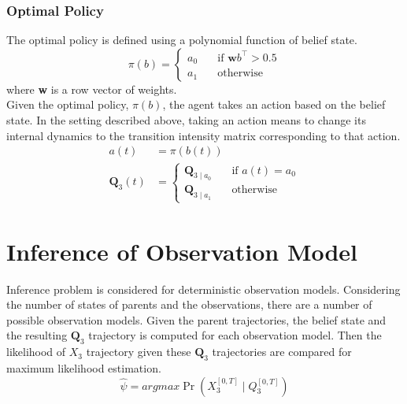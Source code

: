 \subsubsection{Optimal Policy}
The optimal policy is defined using a polynomial function of belief state.
\begin{equation}
\pi(b) = 
\begin{cases}
a_0 & \quad \text{if } \textbf{w}b^\intercal > 0.5 \\
a_1 & \quad \text{otherwise}
\end{cases}
\label{eq:policy}
\end{equation}
where \textbf{w} is a row vector of weights.\\
Given the optimal policy, $ \pi(b) $, the agent takes an action based on the belief state. In the setting described above, taking an action means to change its internal dynamics to the transition intensity matrix corresponding to that action.
\begin{align}
a(t) &= \pi(b(t))\\
\textbf{Q}_3(t) & = \begin{cases}
\textbf{Q}_{3\mid a_{0}} & \quad \text{if } a(t) = a_0 \\
\textbf{Q}_{3\mid a_{1}} & \quad \text{otherwise}
\end{cases}
\end{align}

\section{Inference of Observation Model}
Inference problem is considered for deterministic observation models. Considering the number of states of parents and the observations, there are a number of possible observation models. Given the parent trajectories, the belief state and the resulting $ \textbf{Q}_3 $ trajectory is computed for each observation model. Then the likelihood of $ X_3 $ trajectory given these  $ \textbf{Q}_3 $  trajectories are compared for maximum likelihood estimation.
\begin{equation}
\hat{\psi} = argmax \operatorname{Pr}(X_3^{[0,T]} \mid Q_3^{[0,T]})
\end{equation}

